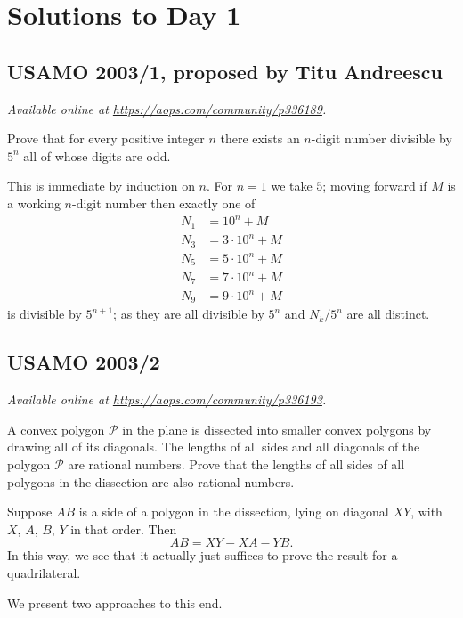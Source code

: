 \documentclass[11pt]{scrartcl}
\begin{document}
\section{Solutions to Day 1}
\subsection{USAMO 2003/1, proposed by Titu Andreescu}
\textsl{Available online at \url{https://aops.com/community/p336189}.}
\begin{mdframed}[style=mdpurplebox,frametitle={Problem statement}]
Prove that for every positive integer $n$
there exists an $n$-digit number divisible by $5^n$
all of whose digits are odd.
\end{mdframed}
This is immediate by induction on $n$.
For $n = 1$ we take $5$;
moving forward if $M$ is a working $n$-digit number then exactly one of
\begin{align*}
  N_1 &= 10^n + M \\
  N_3 &= 3 \cdot 10^n + M \\
  N_5 &= 5 \cdot 10^n + M \\
  N_7 &= 7 \cdot 10^n + M \\
  N_9 &= 9 \cdot 10^n + M
\end{align*}
is divisible by $5^{n+1}$;
as they are all divisible by $5^n$
and $N_k/5^n$ are all distinct.
\pagebreak

\subsection{USAMO 2003/2}
\textsl{Available online at \url{https://aops.com/community/p336193}.}
\begin{mdframed}[style=mdpurplebox,frametitle={Problem statement}]
A convex polygon $\mathcal{P}$ in the plane
is dissected into smaller convex polygons by
drawing all of its diagonals.
The lengths of all sides and all diagonals of the
polygon $\mathcal{P}$ are rational numbers.
Prove that the lengths of all sides of all polygons
in the dissection are also rational numbers.
\end{mdframed}
Suppose $AB$ is a side of a polygon in the dissection,
lying on diagonal $XY$, with $X$, $A$, $B$, $Y$ in that order.
Then \[ AB = XY - XA - YB. \]
In this way, we see that it actually just suffices to
prove the result for a quadrilateral.

We present two approaches to this end.
\end{document}
